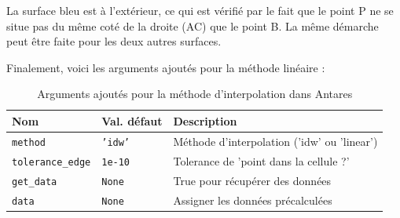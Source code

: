 La surface bleu est à l’extérieur, ce qui est vérifié par le fait que le point P ne se situe pas du même coté de la droite (AC) que le point B.
La même démarche peut être faite pour les deux autres surfaces.

Finalement, voici les arguments ajoutés pour la méthode linéaire :

\label{arguments_ajoutes}
\begin{table}[H]
    \centering
    \begin{tabular}{|l|l|l|}
    \hline
    \textbf{Nom} & \textbf{Val. défaut} & \textbf{Description} \\ \hline %

    \texttt{method} & \texttt{'idw'} & Méthode d'interpolation ('idw' ou 'linear') \\
    \texttt{tolerance\_edge} & \texttt{1e-10} & Tolerance de 'point dans la cellule ?' \\
    \texttt{get\_data} & \texttt{None} & True pour récupérer des données \\ 
    \texttt{data} & \texttt{None} & Assigner les données précalculées \\ \hline
    \end{tabular}
    \caption{Arguments ajoutés pour la méthode d'interpolation dans Antares}
    \label{tab:arguments_interpolation2}
\end{table}

